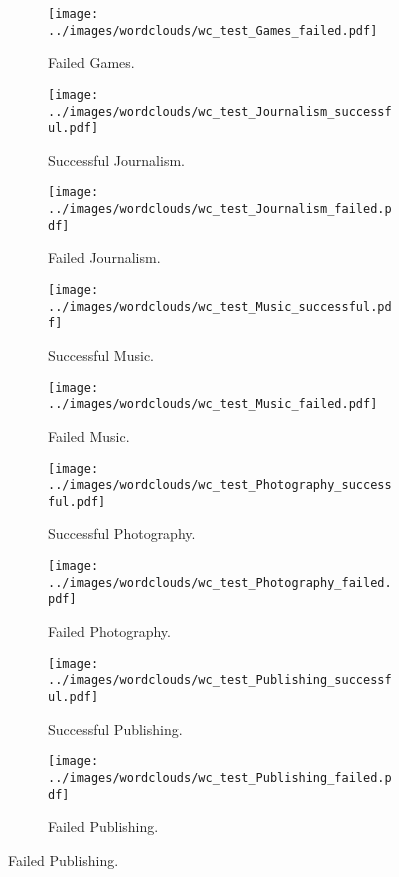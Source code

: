 \documentclass{article}
\begin{document}
\begin{figure}
\begin{subfigure}[i']{0.2\linewidth}
    \centering\texttt{[image: ../images/wordclouds/wc\_test\_Games\_failed.pdf]}
    \caption{Failed Games.}
    \label{fig:Games_f_test}
  \end{subfigure}
  \begin{subfigure}[j]{0.2\linewidth}
    \centering\texttt{[image: ../images/wordclouds/wc\_test\_Journalism\_successful.pdf]}
    \caption{Successful Journalism.}
    \label{fig:Journalism_s_test}
  \end{subfigure} 
  \begin{subfigure}[j']{0.2\linewidth}
    \centering\texttt{[image: ../images/wordclouds/wc\_test\_Journalism\_failed.pdf]}
    \caption{Failed Journalism.}
    \label{fig:Journalism_f_test}
  \end{subfigure}
  \begin{subfigure}[k]{0.2\linewidth}
    \centering\texttt{[image: ../images/wordclouds/wc\_test\_Music\_successful.pdf]}
    \caption{Successful Music.}
    \label{fig:Music_s_test}
  \end{subfigure} 
  \begin{subfigure}[k']{0.2\linewidth}
    \centering\texttt{[image: ../images/wordclouds/wc\_test\_Music\_failed.pdf]}
    \caption{Failed Music.}
    \label{fig:Music_f_test}
  \end{subfigure}
  \begin{subfigure}[l]{0.2\linewidth}
    \centering\texttt{[image: ../images/wordclouds/wc\_test\_Photography\_successful.pdf]}
    \caption{Successful Photography.}
    \label{fig:Photography_s_test}
  \end{subfigure} 
  \begin{subfigure}[l']{0.2\linewidth}
    \centering\texttt{[image: ../images/wordclouds/wc\_test\_Photography\_failed.pdf]}
    \caption{Failed Photography.}
    \label{fig:Photography_f_test}
  \end{subfigure}
    \begin{subfigure}[m]{0.2\linewidth}
    \centering\texttt{[image: ../images/wordclouds/wc\_test\_Publishing\_successful.pdf]}
    \caption{Successful Publishing.}
    \label{fig:Publishing_s_test}
  \end{subfigure} 
  \begin{subfigure}[m']{0.2\linewidth}
    \centering\texttt{[image: ../images/wordclouds/wc\_test\_Publishing\_failed.pdf]}
    \caption{Failed Publishing.}
    \label{fig:Publishing_f_test}

\end{subfigure}
\end{figure}
\end{document}
